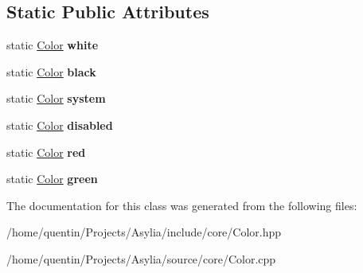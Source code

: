 \subsection*{Static Public Attributes}
\begin{DoxyCompactItemize}
\item 
\hypertarget{classColor_a7257e1adfe8a4a26b1029d5523700410}{static \hyperlink{classColor}{Color} {\bfseries white}}\label{classColor_a7257e1adfe8a4a26b1029d5523700410}

\item 
\hypertarget{classColor_a47086e1bb4d747932c264d53ab570417}{static \hyperlink{classColor}{Color} {\bfseries black}}\label{classColor_a47086e1bb4d747932c264d53ab570417}

\item 
\hypertarget{classColor_a2fbd1aa76c688685adf2b29efffbc8a1}{static \hyperlink{classColor}{Color} {\bfseries system}}\label{classColor_a2fbd1aa76c688685adf2b29efffbc8a1}

\item 
\hypertarget{classColor_a8a69ed9ef0af1289ba995c6c8a0ba027}{static \hyperlink{classColor}{Color} {\bfseries disabled}}\label{classColor_a8a69ed9ef0af1289ba995c6c8a0ba027}

\item 
\hypertarget{classColor_abe661abffec399c494c4d3ff4ae26f83}{static \hyperlink{classColor}{Color} {\bfseries red}}\label{classColor_abe661abffec399c494c4d3ff4ae26f83}

\item 
\hypertarget{classColor_a90dd40fe4beeda39a505c6be65346261}{static \hyperlink{classColor}{Color} {\bfseries green}}\label{classColor_a90dd40fe4beeda39a505c6be65346261}

\end{DoxyCompactItemize}


The documentation for this class was generated from the following files\-:\begin{DoxyCompactItemize}
\item 
/home/quentin/\-Projects/\-Asylia/include/core/Color.\-hpp\item 
/home/quentin/\-Projects/\-Asylia/source/core/Color.\-cpp\end{DoxyCompactItemize}
